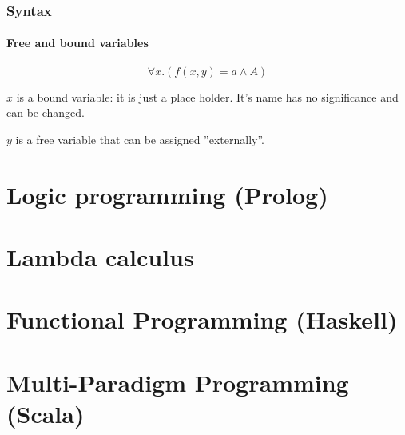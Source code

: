 \subsubsection{Syntax}

\paragraph{Free and bound variables} \[
	\forall x .(f(x,y) = a \land A)
\]

$x$ is a bound variable: it is just a place holder. It's name has no significance and can be changed.

$y$ is a free variable that can be assigned ''externally''.



\section{Logic programming (Prolog)}

\section{Lambda calculus}

\section{Functional Programming (Haskell)}

\section{Multi-Paradigm Programming (Scala)}



